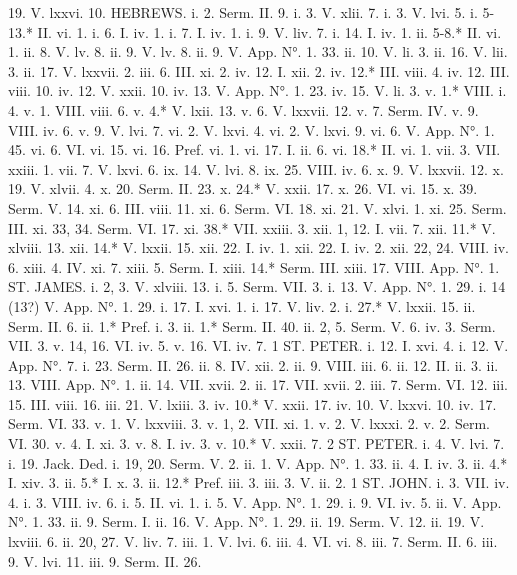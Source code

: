 19.	V. lxxvi. 10.
HEBREWS.
i. 2.	Serm. II. 9.
i. 3.	V. xlii. 7.
i. 3.	V. lvi. 5.
i. 5-13.*	II. vi. 1.
i. 6.	I. iv. 1.
i. 7.	I. iv. 1.
i. 9.	V. liv. 7.
i. 14.	I. iv. 1.
ii. 5-8.*	II. vi. 1.
ii. 8.	V. lv. 8.
ii. 9.	V. lv. 8.
ii. 9.	V. App. N°. 1. 33.
ii. 10.	V. li. 3.
ii. 16.	V. lii. 3.
ii. 17.	V. lxxvii. 2.
iii. 6.	III. xi. 2.
iv. 12.	I. xii. 2.
iv. 12.*	III. viii. 4.
iv. 12.	III. viii. 10.
iv. 12.	V. xxii. 10.
iv. 13.	V. App. N°. 1. 23.
iv. 15.	V. li. 3.
v. 1.*	VIII. i. 4.
v. 1.	VIII. viii. 6.
v. 4.*	V. lxii. 13.
v. 6.	V. lxxvii. 12.
v. 7.	Serm. IV.
v. 9.	VIII. iv. 6.
v. 9.	V. lvi. 7.
vi. 2.	V. lxvi. 4.
vi. 2.	V. lxvi. 9.
vi. 6.	V. App. N°. 1. 45.
vi. 6.	VI. vi. 15.
vi. 16.	Pref. vi. 1.
vi. 17.	I. ii. 6.
vi. 18.*	II. vi. 1.
vii. 3.	VII. xxiii. 1.
vii. 7.	V. lxvi. 6.
ix. 14.	V. lvi. 8.
ix. 25.	VIII. iv. 6.
x. 9.	V. lxxvii. 12.
x. 19.	V. xlvii. 4.
x. 20.	Serm. II. 23.
x. 24.*	V. xxii. 17.
x. 26.	VI. vi. 15.
x. 39.	Serm. V. 14.
xi. 6.	III. viii. 11.
xi. 6.	Serm. VI. 18.
xi. 21.	V. xlvi. 1.
xi. 25.	Serm. III.
xi. 33, 34.	Serm. VI. 17.
xi. 38.*	VII. xxiii. 3.
xii. 1, 12.	I. vii. 7.
xii. 11.*	V. xlviii. 13.
xii. 14.*	V. lxxii. 15.
xii. 22.	I. iv. 1.
xii. 22.	I. iv. 2.
xii. 22, 24.	VIII. iv. 6.
xiii. 4.	IV. xi. 7.
xiii. 5.	Serm. I.
xiii. 14.*	Serm. III.
xiii. 17.	VIII. App. N°. 1.
ST. JAMES.
i. 2, 3.	V. xlviii. 13.
i. 5.	Serm. VII. 3.
i. 13.	V. App. N°. 1. 29.
i. 14 (13?)	V. App. N°. 1. 29.
i. 17.	I. xvi. 1.
i. 17.	V. liv. 2.
i. 27.*	V. lxxii. 15.
ii.	Serm. II. 6.
ii. 1.*	Pref. i. 3.
ii. 1.*	Serm. II. 40.
ii. 2, 5.	Serm. V. 6.
iv. 3.	Serm. VII. 3.
v. 14, 16.	VI. iv. 5.
v. 16.	VI. iv. 7.
1 ST. PETER.
i. 12.	I. xvi. 4.
i. 12.	V. App. N°. 7.
i. 23.	Serm. II. 26.
ii. 8.	IV. xii. 2.
ii. 9.	VIII. iii. 6.
ii. 12.	II. ii. 3.
ii. 13.	VIII. App. N°. 1.
ii. 14.	VII. xvii. 2.
ii. 17.	VII. xvii. 2.
iii. 7.	Serm. VI. 12.
iii. 15.	III. viii. 16.
iii. 21.	V. lxiii. 3.
iv. 10.*	V. xxii. 17.
iv. 10.	V. lxxvi. 10.
iv. 17.	Serm. VI. 33.
v. 1.	V. lxxviii. 3.
v. 1, 2.	VII. xi. 1.
v. 2.	V. lxxxi. 2.
v. 2.	Serm. VI. 30.
v. 4.	I. xi. 3.
v. 8.	I. iv. 3.
v. 10.*	V. xxii. 7.
2 ST. PETER.
i. 4.	V. lvi. 7.
i. 19.	Jack. Ded.
i. 19, 20.	Serm. V. 2.
ii. 1.	V. App. N°. 1. 33.
ii. 4.	I. iv. 3.
ii. 4.*	I. xiv. 3.
ii. 5.*	I. x. 3.
ii. 12.*	Pref. iii. 3.
iii. 3.	V. ii. 2.
1 ST. JOHN.
i. 3.	VII. iv. 4.
i. 3.	VIII. iv. 6.
i. 5.	II. vi. 1.
i. 5.	V. App. N°. 1. 29.
i. 9.	VI. iv. 5.
ii.	V. App. N°. 1. 33.
ii. 9.	Serm. I.
ii. 16.	V. App. N°. 1. 29.
ii. 19.	Serm. V. 12.
ii. 19.	V. lxviii. 6.
ii. 20, 27.	V. liv. 7.
iii. 1.	V. lvi. 6.
iii. 4.	VI. vi. 8.
iii. 7.	Serm. II. 6.
iii. 9.	V. lvi. 11.
iii. 9.	Serm. II. 26.
